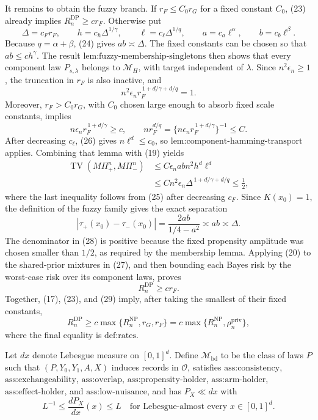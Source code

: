 It remains to obtain the fuzzy branch.  If \(r_F\le C_0r_G\) for a fixed constant \(C_0\), (23) already implies \(R_n^{\mathrm{DP}}\ge c r_F\).  Otherwise put
\[
 \Delta=c_Fr_F,\qquad
 h=c_h\Delta^{1/\gamma},\qquad
 \ell=c_\ell\Delta^{1/q},\qquad
 a=c_a\ell^\alpha,\qquad b=c_b\ell^\beta.                  \tag{24}
\]
Because \(q=\alpha+\beta\), (24) gives \(ab\asymp\Delta\).  The fixed constants can be chosen so that \(ab\le c h^\gamma\).  The result \(\text{lem:fuzzy-membership-singletons}\) then shows that every component law \(P_{s,\lambda}\) belongs to \(\mathcal M_H\), with target independent of \(\lambda\).  Since \(n^2\epsilon_n\ge1\), the truncation in \(r_F\) is also inactive, and
\[
 n^2\epsilon_n r_F^{\,1+d/\gamma+d/q}=1.                                        \tag{25}
\]
Moreover, \(r_F>C_0r_G\), with \(C_0\) chosen large enough to absorb fixed scale constants, implies
\[
 n\epsilon_n r_F^{\,1+d/\gamma}\ge c,
 \qquad
 n r_F^{d/q}=\{n\epsilon_n r_F^{\,1+d/\gamma}\}^{-1}\le C.                  \tag{26}
\]
After decreasing \(c_\ell\), (26) gives \(n\ell^d\le c_0\), so \(\text{lem:component-hamming-transport}\) applies.  Combining that lemma with (19) yields
\[
 \begin{aligned}
 \operatorname{TV}(M\Pi_+^n,M\Pi_-^n)
 &\le C\epsilon_nabn^2h^d\ell^d\\
 &\le Cn^2\epsilon_n\Delta^{\,1+d/\gamma+d/q}
 \le\tfrac12,                                                                  \tag{27}
 \end{aligned}
\]
where the last inequality follows from (25) after decreasing \(c_F\).  Since \(K(x_0)=1\), the definition of the fuzzy family gives the exact separation
\[
 \left|\tau_+(x_0)-\tau_-(x_0)\right|
 =\frac{2ab}{1/4-a^2}\asymp ab\asymp\Delta.                                  \tag{28}
\]
The denominator in (28) is positive because the fixed propensity amplitude was chosen smaller than \(1/2\), as required by the membership lemma.  Applying (20) to the shared-prior mixtures in (27), and then bounding each Bayes risk by the worst-case risk over its component laws, proves
\[
 R_n^{\mathrm{DP}}\ge c r_F.                                                     \tag{29}
\]
Together, (17), (23), and (29) imply, after taking the smallest of their fixed constants,
\[
 R_n^{\mathrm{DP}}
 \ge c\max\{R_n^{\mathrm{NP}},r_G,r_F\}
 =c\max\{R_n^{\mathrm{NP}},\rho_n^{\mathrm{priv}}\},
\]
where the final equality is \(\text{def:rates}\).

Let \(dx\) denote Lebesgue measure on \([0,1]^d\).  Define \(\mathcal M_{\mathrm{bd}}\) to be the class of laws \(P\) such that \((P,Y_0,Y_1,A,X)\) induces records in \(\mathcal O\), satisfies \(\text{ass:consistency}\), \(\text{ass:exchangeability}\), \(\text{ass:overlap}\), \(\text{ass:propensity-holder}\), \(\text{ass:arm-holder}\), \(\text{ass:effect-holder}\), and \(\text{ass:low-nuisance}\), and has \(P_X\ll dx\) with
\[
 L^{-1}\le \frac{dP_X}{dx}(x)\le L
 \quad\text{for Lebesgue-almost every }x\in[0,1]^d.
\]

